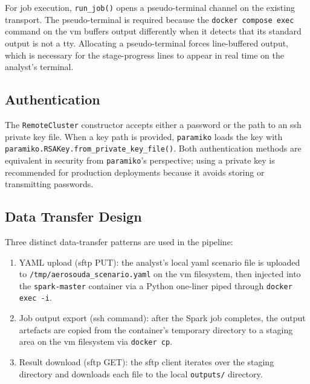 For job execution, \texttt{run\_job()} opens a pseudo-terminal channel on the existing transport.
The pseudo-terminal is required because the \texttt{docker compose exec} command on the \gls{vm}
buffers output differently when it detects that its standard output is not a \gls{tty}.
Allocating a pseudo-terminal forces line-buffered output, which is necessary for the stage-progress
lines to appear in real time on the analyst's terminal.

\subsection{Authentication}
\label{subsec:rm-authentication}

The \texttt{RemoteCluster} constructor accepts either a password or the path to an \gls{ssh}
private key file.  When a key path is provided, \texttt{paramiko} loads the key with
\texttt{para\-miko.\allowbreak{}RSAKey.\allowbreak{}from\_private\_key\_file()}.
Both authentication methods are equivalent
in security from \texttt{paramiko}'s perspective; using a private key is recommended for
production deployments because it avoids storing or transmitting passwords.

\subsection{Data Transfer Design}
\label{subsec:rm-data-transfer-design}

Three distinct data-transfer patterns are used in the pipeline:

\begin{enumerate}
  \item YAML upload (\gls{sftp} PUT): the analyst's local \gls{yaml} scenario file is
        uploaded to \texttt{/tmp/aerosouda\_scenario.yaml} on the \gls{vm} filesystem, then
        injected into the \texttt{spark-master} container via a Python one-liner piped through
        \texttt{docker exec -i}.
  \item Job output export (\gls{ssh} command): after the Spark job completes, the
        output artefacts are copied from the container's temporary directory to a staging area on
        the \gls{vm} filesystem via \texttt{docker cp}.
  \item Result download (\gls{sftp} GET): the \gls{sftp} client iterates over the
        staging directory and downloads each file to the local \texttt{outputs/} directory.
\end{enumerate}


